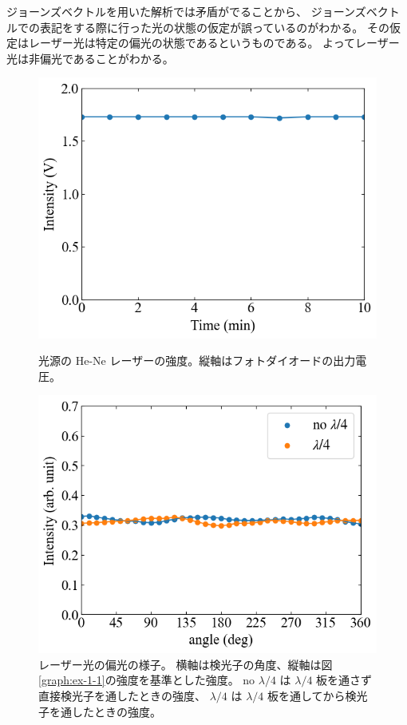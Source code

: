 \documentclass[9pt,dvipdfmx,a4paper]{jsarticle}
\begin{document}
ジョーンズベクトルを用いた解析では矛盾がでることから、
ジョーンズベクトルでの表記をする際に行った光の状態の仮定が誤っているのがわかる。
その仮定はレーザー光は特定の偏光の状態であるというものである。
よってレーザー光は非偏光であることがわかる。


\begin{figure}[H]
    \centering
    \begin{minipage}[t]{0.48\columnwidth}
        \centering
        \includegraphics[width=\columnwidth]{11_29_00.png}
        \caption{光源の He-Ne レーザーの強度。縦軸はフォトダイオードの出力電圧。}
        \label{graph:ex-1-1}
    \end{minipage}
    \hfill
    \begin{minipage}[t]{0.48\columnwidth}
        \centering
        \includegraphics[width=\columnwidth]{11_29_01.png}
        \caption{レーザー光の偏光の様子。
        横軸は検光子の角度、縦軸は図\ref{graph:ex-1-1}の強度を基準とした強度。
        no \(\lambda/4\) は \(\lambda/4\) 板を通さず直接検光子を通したときの強度、
        \(\lambda/4\) は \(\lambda/4\) 板を通してから検光子を通したときの強度。}
        \label{graph:ex-1-2}
    \end{minipage}
\end{figure}
\end{document}
